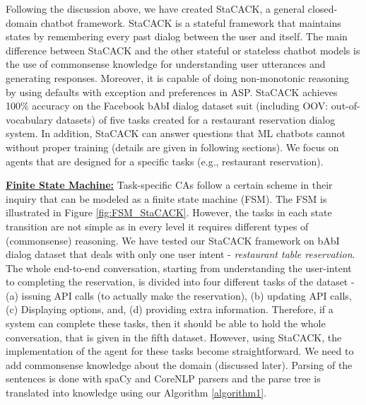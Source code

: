 \documentclass[letterpaper]{article}
\begin{document}
Following the discussion above, we have created StaCACK, a general closed-domain chatbot framework. StaCACK is a stateful framework that maintains states by remembering every past dialog between the user and itself. The main difference between StaCACK and the other stateful or stateless chatbot models is the use of commonsense knowledge for understanding user utterances and generating responses. Moreover, it is capable of doing non-monotonic reasoning by using defaults with exception and preferences in ASP. StaCACK achieves 100\% accuracy on the Facebook bAbI dialog dataset suit \cite{babi_dialog} (including OOV: out-of-vocabulary datasets) of five tasks  created for a restaurant reservation dialog system. In addition, StaCACK can answer questions that ML chatbots cannot without proper training (details are given in following sections). We focus on agents that are designed for a specific tasks (e.g., restaurant reservation).




\noindent\textbf{\underline{Finite State Machine:}}
Task-specific CAs follow a certain scheme in their inquiry that can be modeled as a finite state machine (FSM).
The FSM is illustrated in Figure \ref{fig:FSM_StaCACK}. However, the tasks in each state transition are not simple as in every level it requires different types of (commonsense) reasoning. We have tested our StaCACK framework on bAbI dialog dataset that deals with only one user intent - \textit{restaurant table reservation}. The whole end-to-end conversation, starting from understanding the user-intent to completing the reservation, is divided into four different tasks of the dataset - (a) issuing API calls (to actually make the reservation), (b) updating API calls, (c) Displaying options, and, (d) providing extra information. Therefore, if a system can complete these tasks, then it should be able to hold the whole conversation, that is given in the fifth dataset. However, using StaCACK, the implementation of the agent for these tasks become straightforward. We need to add commonsense knowledge about the domain (discussed later). Parsing of the sentences is done with spaCy and CoreNLP parsers and the parse tree is translated into knowledge using our Algorithm \ref{algorithm1}.
\end{document}
